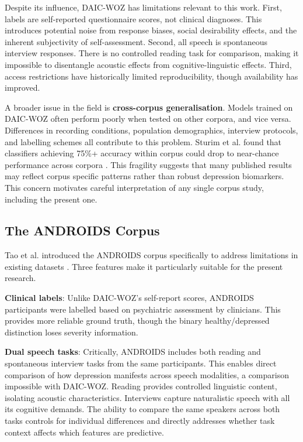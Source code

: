 Despite its influence, DAIC-WOZ has limitations relevant to this work. First, labels are self-reported questionnaire scores, not clinical diagnoses. This introduces potential noise from response biases, social desirability effects, and the inherent subjectivity of self-assessment. Second, all speech is spontaneous interview responses. There is no controlled reading task for comparison, making it impossible to disentangle acoustic effects from cognitive-linguistic effects. Third, access restrictions have historically limited reproducibility, though availability has improved.

A broader issue in the field is \textbf{cross-corpus generalisation}. Models trained on DAIC-WOZ often perform poorly when tested on other corpora, and vice versa. Differences in recording conditions, population demographics, interview protocols, and labelling schemes all contribute to this problem. Sturim et al. found that classifiers achieving 75\%+ accuracy within corpus could drop to near-chance performance across corpora \cite{sturim2011automatic}. This fragility suggests that many published results may reflect corpus specific patterns rather than robust depression biomarkers. This concern motivates careful interpretation of any single corpus study, including the present one.

\subsection{The ANDROIDS Corpus}

Tao et al. introduced the ANDROIDS corpus specifically to address limitations in existing datasets \cite{Tao2023ANDROIDS}. Three features make it particularly suitable for the present research.

\textbf{Clinical labels}: Unlike DAIC-WOZ's self-report scores, ANDROIDS participants were labelled based on psychiatric assessment by clinicians. This provides more reliable ground truth, though the binary healthy/depressed distinction loses severity information.

\textbf{Dual speech tasks}: Critically, ANDROIDS includes both reading and spontaneous interview tasks from the same participants. This enables direct comparison of how depression manifests across speech modalities, a comparison impossible with DAIC-WOZ. Reading provides controlled linguistic content, isolating acoustic characteristics. Interviews capture naturalistic speech with all its cognitive demands. The ability to compare the same speakers across both tasks controls for individual differences and directly addresses whether task context affects which features are predictive.

